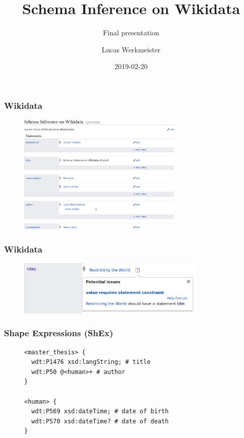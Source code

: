 \documentclass[aspectratio=169]{beamer}
\title{Schema Inference on Wikidata}
\subtitle{Final presentation}
\author{Lucas Werkmeister}
\date{2019-02-20}
\begin{document}
\frame{\titlepage}

\begin{frame}
  \frametitle{Wikidata}
  \begin{figure}
    \includegraphics[width=0.7\textwidth]{item}
  \end{figure}
\end{frame}

\begin{frame}
  \frametitle{Wikidata}
  \begin{figure}
    \includegraphics[width=0.8\textwidth]{constraint}
  \end{figure}
\end{frame}

\begin{frame}[fragile]
  \frametitle{Shape Expressions (ShEx)}
  \begin{figure}
    \begin{lstlisting}[language=sparql]
<master_thesis> {
  wdt:P1476 xsd:langString; # title
  wdt:P50 @<human>+ # author
}

<human> {
  wdt:P569 xsd:dateTime; # date of birth
  wdt:P570 xsd:dateTime? # date of death
}
    \end{lstlisting}
  \end{figure}
\end{frame}
\end{document}
